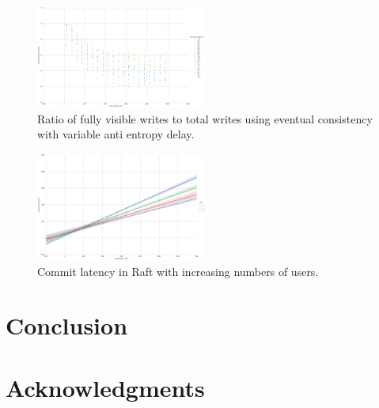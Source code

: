 \documentclass[letterpaper,twocolumn,10pt]{article}
\begin{document}
\begin{figure}[h]
    \centering
    \includegraphics[width=0.5\textwidth]{figures/ae_viz_ratio}
    \caption{Ratio of fully visible writes to total writes using eventual consistency with variable anti entropy delay.}
\end{figure}

\begin{figure}[h]
    \centering
    \includegraphics[width=0.5\textwidth]{figures/raft_commit_latency}
    \caption{Commit latency in Raft with increasing numbers of users.}
\end{figure}

\section{Conclusion}

\section*{Acknowledgments}

{\footnotesize 
}

\end{document}
